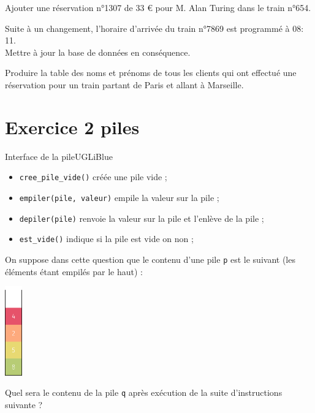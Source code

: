 \documentclass[a4paper,12pt,eval,firamath]{nsi}
\begin{document}
\begin{enumerate}
\begin{enumalph}
                  
                  \item Ajouter une réservation n°1307 de 33 € pour M. Alan Turing dans le train n°654.\\
                  


                  \item Suite à un changement, l'horaire d'arrivée du train n°7869 est programmé à 08: 11.\\
                        Mettre à jour la base de données en conséquence.\\

                  \item Produire la table des noms et prénoms de tous les clients qui ont effectué une réservation pour un train partant de Paris et allant à Marseille.\\
                  
            \end{enumalph}
\end{enumerate}
\section*{Exercice 2 \small\hfill  piles}

\begin{encadrecolore}{Interface de la pile}{UGLiBlue}
      \begin{itemize}
            \item \texttt{cree_pile_vide()}  créée une pile vide ;
            \item \texttt{empiler(pile, valeur)} empile la valeur sur la pile ;
            \item \texttt{depiler(pile)} renvoie la valeur sur la pile et l'enlève de la pile ;
            \item \texttt{est_vide()} indique si la pile est vide on non ;
      \end{itemize}
\end{encadrecolore}


\question On suppose dans cette question que le contenu d'une pile \texttt{p} est le suivant (les éléments étant
empilés par le haut) :
\begin{center}
      \includegraphics[width=0.75cm]{img/pile1.png}
\end{center}
Quel sera le contenu de la pile \texttt{q} après exécution de la suite d'instructions suivante ?\\
\end{document}

